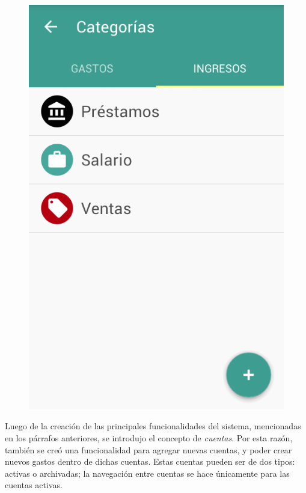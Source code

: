 \begin{figure}[ht]
\begin{minipage}{.5\textwidth}
  \includegraphics[scale=0.4,type=png,ext=.png,read=.png]{imagenes/income_categories}
  \captionsetup{justification=centering}
  \label{fig:interfazListarIncomeCategories}
\end{minipage}
\end{figure}

Luego de la creación de las principales funcionalidades del sistema, mencionadas en los párrafos anteriores, se introdujo el concepto de \textit{cuentas}. Por esta razón, también se creó una funcionalidad para agregar nuevas cuentas, y poder crear nuevos gastos dentro de dichas cuentas. Estas cuentas pueden ser de dos tipos: activas o archivadas; la navegación entre cuentas se hace únicamente para las cuentas activas. 

